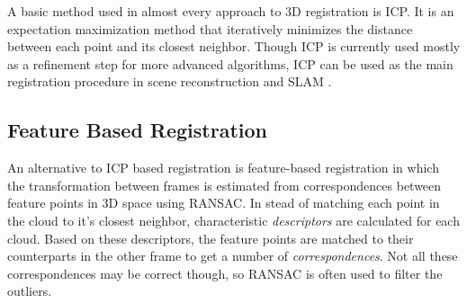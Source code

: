 \documentclass[a4paper]{article}
\begin{document}
A basic method used in almost every approach to 3D registration is \ac{ICP}\cite{besl1992method}. It is an expectation maximization method that iteratively minimizes the distance between each point and its closest neighbor. Though \ac{ICP} is currently used mostly as a refinement step for more advanced algorithms, \ac{ICP} can be used as the main registration procedure in scene reconstruction \cite{izadi2011kinectfusion,newcombe2011kinectfusion} and \ac{SLAM} \cite{nuchter20076d}.




\subsection{Feature Based Registration}

An alternative to \ac{ICP} based registration is feature-based registration in which the transformation between frames is estimated from correspondences between feature points in 3D space using \ac{RANSAC}. In stead of matching each point in the cloud to it's closest neighbor, characteristic \emph{descriptors} are calculated for each cloud. Based on these descriptors, the feature points are matched to their counterparts in the other frame to get a number of \emph{correspondences}. Not all these correspondences may be correct though, so \ac{RANSAC} is often used to filter the outliers. 
\end{document}
